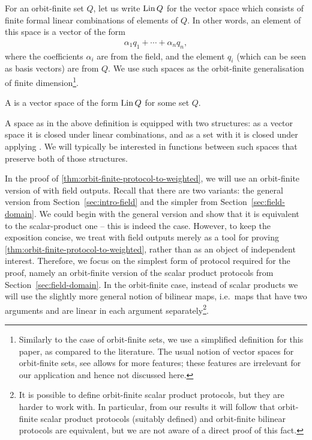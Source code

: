 For an orbit-finite set $Q$, let us write $\operatorname{Lin} Q$ for the vector space
which consists of finite formal linear combinations of elements of $Q$. In
other words, an element of this space is a vector of the form 
\begin{align*}
\alpha_1 q_1 + \cdots + \alpha_n q_n,
\end{align*}
where the coefficients $\alpha_i$ are from the field, and the element $q_i$ (which can be seen as basis vectors) are from $Q$. We use such spaces as the orbit-finite generalisation of finite dimension\footnote{Similarly to the case of orbit-finite sets, we use a simplified definition for this paper, as compared to the literature. The usual notion of vector spaces for orbit-finite sets, see \cite[Definition 8.1]{bojanczyk_slightly} allows for more features; these features are irrelevant for our application and hence not discussed here.}.

\begin{definition}
    \label{def:orbit-finite-vector-space}
    \AP
    A  
    is a vector space of the form $\operatorname{Lin} Q$ for some  set $Q$.
\end{definition}
A space as in the above definition is equipped with two structures: as a vector
space it is closed under linear combinations, and as a set with  it
is closed under applying . We will typically be
interested in functions between such spaces that preserve both of those
structures.

In the proof of \cref{thm:orbit-finite-protocol-to-weighted}, we will use an
orbit-finite version of  with field outputs. Recall that there
are two variants: the general version from Section~\ref{sec:intro-field} and
the simpler  from Section~\ref{sec:field-domain}.
We could begin with the general version and show that it is equivalent to the
scalar-product one -- this is indeed the case. However, to keep the exposition
concise, we treat  with field outputs merely as a tool
for proving \cref{thm:orbit-finite-protocol-to-weighted}, rather than as an
object of independent interest. Therefore, we focus on the simplest form of
protocol required for the proof, namely an orbit-finite version of the scalar
product protocols from Section~\ref{sec:field-domain}. In the orbit-finite
case, instead of scalar products we will use the slightly more general notion
of bilinear maps, i.e.~maps that have two arguments and are linear in each
argument separately\footnote{It is possible to define orbit-finite scalar
  product protocols, but they are harder to work with. In particular, from our
  results it will follow that orbit-finite scalar product protocols (suitably
  defined) and orbit-finite bilinear protocols are equivalent, but we are not
  aware of a direct proof of this fact.}. 

